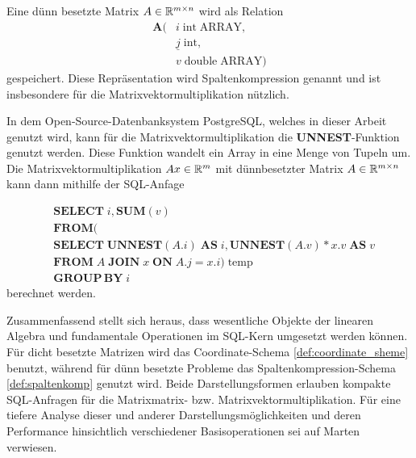 \begin{defi}
    \label{def:spaltenkomp}
Eine dünn besetzte Matrix $A \in \mathbb{R}^{m \times n}$ wird als Relation
\begin{align*}
    \mathbf{A}(&i \; \mathrm{int} \; \mathrm{ARRAY}, \\
               &\underline{j} \; \mathrm{int}, \\
               &v \; \mathrm{double} \; \mathrm{ARRAY}
               )
\end{align*}
gespeichert. Diese Repräsentation wird Spaltenkompression genannt und ist insbesondere für die Matrixvektormultiplikation nützlich.
\end{defi}
In dem Open-Source-Datenbanksystem PostgreSQL\cite{momjian2001postgresql}, welches in dieser Arbeit genutzt wird, kann für die Matrixvektormultiplikation die \textbf{UNNEST}-Funktion genutzt werden. Diese Funktion wandelt ein Array in eine Menge von Tupeln um. Die Matrixvektormultiplikation $Ax \in \mathbb{R}^m$ mit dünnbesetzter Matrix $A \in \mathbb{R}^{m \times n}$ kann dann mithilfe der SQL-Anfage

\begin{align*}
    &\mathbf{SELECT} \; i, \mathbf{SUM}(v)\\
    &\mathbf{FROM} (\\
    &\mathbf{SELECT} \; \mathbf{UNNEST}(A.i)\; \mathbf{AS} \; i, \mathbf{UNNEST}(A.v)*x.v \; \mathbf{AS} \; v \\
    &\mathbf{FROM} \; A \; \mathbf{JOIN} \; x \; \mathbf{ON} \; A.j=x.i ) \; \text{temp} \\
    &\mathbf{GROUP} \, \mathbf{BY} \; i
\end{align*}
berechnet werden.

Zusammenfassend stellt sich heraus, dass wesentliche Objekte der linearen Algebra und fundamentale Operationen im SQL-Kern umgesetzt werden können. Für dicht besetzte Matrizen wird das Coordinate-Schema \ref{def:coordinate_sheme} benutzt, während für dünn besetzte Probleme das Spaltenkompression-Schema \ref{def:spaltenkomp} genutzt wird. Beide Darstellungsformen erlauben kompakte SQL-Anfragen für die Matrixmatrix- bzw. Matrixvektormultiplikation. Für eine tiefere Analyse dieser und anderer Darstellungsmöglichkeiten und deren Performance hinsichtlich verschiedener Basisoperationen sei auf Marten \cite{martendiss} verwiesen.





